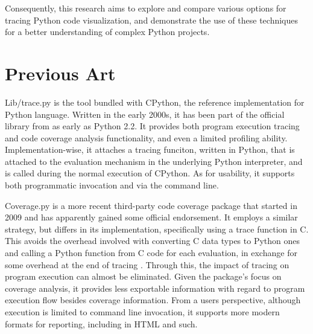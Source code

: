 \documentclass[conference]{IEEEtran}
\begin{document}
Consequently, this research aims to explore and compare various options for tracing Python code visualization, and demonstrate the use of these techniques for a better understanding of complex Python projects.\par

\section{Previous Art} %
Lib/trace.py is the tool bundled with CPython, the reference implementation for Python language\cite{cpythonlibtracepy}. Written in the early 2000s, it has been part of the official library from as early as Python 2.2. It provides both program execution tracing and code coverage analysis functionality, and even a limited profiling ability. Implementation-wise, it attaches a tracing funciton, written in Python, that is attached to the evaluation mechanism in the underlying Python interpreter, and is called during the normal execution of CPython\cite{trace}. As for usability, it supports both programmatic invocation and via the command line.\par

Coverage.py is a more recent third-party code coverage package that started in 2009 and has apparently gained some official endorsement\cite{batchelder_2023_coveragepy}. It employs a similar strategy, but differs in its implementation, specifically using a trace function in C. This avoids the overhead involved with converting C data types to Python ones and calling a Python function from C code for each evaluation, in exchange for some overhead at the end of tracing \cite{a2011_how}.
Through this, the impact of tracing on program execution can almost be eliminated. Given the package's focus on coverage analysis, it provides less exportable information with regard to program execution flow besides coverage information. From a users perspective, although execution is limited to command line invocation, it supports more modern formats for reporting, including in HTML and such. \par
\end{document}
